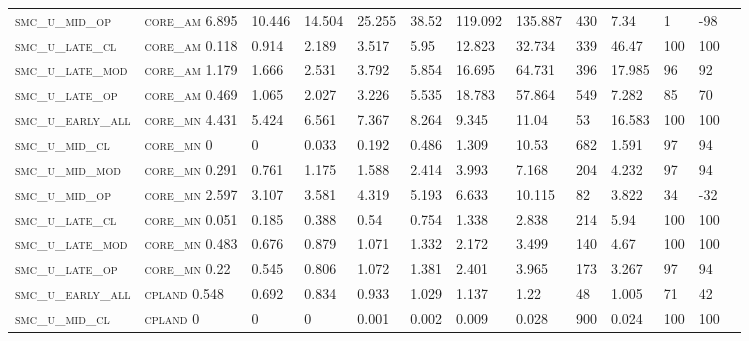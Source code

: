\begin{landscape}
\begin{center}
\begin{footnotesize}
\begin{longtable}{lllllllllllll}
\textsc{smc\_u\_mid\_op   } & \textsc{core\_am  }   6.895    & 10.446   & 14.504   & 25.255   & 38.52    & 119.092  & 135.887  & 430  & 7.34     & 1   & -98  \\
\textsc{smc\_u\_late\_cl  } & \textsc{core\_am  }   0.118    & 0.914    & 2.189    & 3.517    & 5.95     & 12.823   & 32.734   & 339  & 46.47    & 100 & 100  \\
\textsc{smc\_u\_late\_mod } & \textsc{core\_am  }   1.179    & 1.666    & 2.531    & 3.792    & 5.854    & 16.695   & 64.731   & 396  & 17.985   & 96  & 92   \\
\textsc{smc\_u\_late\_op  } & \textsc{core\_am  }   0.469    & 1.065    & 2.027    & 3.226    & 5.535    & 18.783   & 57.864   & 549  & 7.282    & 85  & 70   \\
\textsc{smc\_u\_early\_all} & \textsc{core\_mn  }   4.431    & 5.424    & 6.561    & 7.367    & 8.264    & 9.345    & 11.04    & 53   & 16.583   & 100 & 100  \\
\textsc{smc\_u\_mid\_cl   } & \textsc{core\_mn  }   0        & 0        & 0.033    & 0.192    & 0.486    & 1.309    & 10.53    & 682  & 1.591    & 97  & 94   \\
\textsc{smc\_u\_mid\_mod  } & \textsc{core\_mn  }   0.291    & 0.761    & 1.175    & 1.588    & 2.414    & 3.993    & 7.168    & 204  & 4.232    & 97  & 94   \\
\textsc{smc\_u\_mid\_op   } & \textsc{core\_mn  }   2.597    & 3.107    & 3.581    & 4.319    & 5.193    & 6.633    & 10.115   & 82   & 3.822    & 34  & -32  \\
\textsc{smc\_u\_late\_cl  } & \textsc{core\_mn  }   0.051    & 0.185    & 0.388    & 0.54     & 0.754    & 1.338    & 2.838    & 214  & 5.94     & 100 & 100  \\
\textsc{smc\_u\_late\_mod } & \textsc{core\_mn  }   0.483    & 0.676    & 0.879    & 1.071    & 1.332    & 2.172    & 3.499    & 140  & 4.67     & 100 & 100  \\
\textsc{smc\_u\_late\_op  } & \textsc{core\_mn  }   0.22     & 0.545    & 0.806    & 1.072    & 1.381    & 2.401    & 3.965    & 173  & 3.267    & 97  & 94   \\
\textsc{smc\_u\_early\_all} & \textsc{cpland    }   0.548    & 0.692    & 0.834    & 0.933    & 1.029    & 1.137    & 1.22     & 48   & 1.005    & 71  & 42   \\
\textsc{smc\_u\_mid\_cl   } & \textsc{cpland    }   0        & 0        & 0        & 0.001    & 0.002    & 0.009    & 0.028    & 900  & 0.024    & 100 & 100  \\

\end{longtable}
\end{footnotesize}
\end{center}
\end{landscape}
